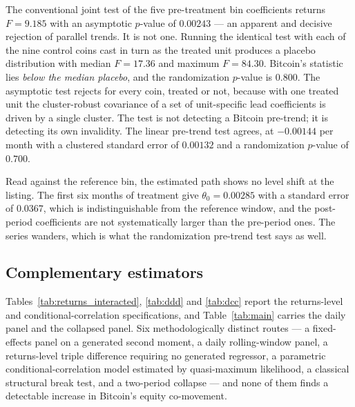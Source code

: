 \documentclass[12pt,a4paper]{article}
\begin{document}
The conventional joint test of the five pre-treatment bin coefficients returns
$F = 9.185$ with an asymptotic $p$-value of
$0.00243$ — an apparent and decisive rejection of parallel trends. It is not one. Running the identical test with each of the nine control coins cast in turn as the treated unit produces a placebo distribution with median
$F = 17.36$ and maximum
$F = 84.30$. Bitcoin's statistic lies \emph{below the median placebo}, and the randomization $p$-value is
$0.800$. The asymptotic test rejects for every coin, treated or not, because with one treated unit the cluster-robust covariance of a set of unit-specific lead coefficients is driven by a single cluster. The test is not detecting a Bitcoin pre-trend; it is detecting its own invalidity. The linear pre-trend test agrees, at
$-0.00144$ per month with a clustered standard error of $0.00132$ and a randomization $p$-value of
$0.700$.

Read against the reference bin, the estimated path shows no level shift at the listing. The first six months of treatment give
$\theta_0 = 0.00285$ with a standard error of $0.0367$, which is indistinguishable from the reference window, and the post-period coefficients are not systematically larger than the pre-period ones. The series wanders, which is what the randomization pre-trend test says as well.

\subsection{Complementary estimators}

Tables~\ref{tab:returns_interacted}, \ref{tab:ddd} and \ref{tab:dcc} report the returns-level and conditional-correlation specifications, and Table~\ref{tab:main} carries the daily panel and the collapsed panel. Six methodologically distinct routes — a fixed-effects panel on a generated second moment, a daily rolling-window panel, a returns-level triple difference requiring no generated regressor, a parametric conditional-correlation model estimated by quasi-maximum likelihood, a classical structural break test, and a two-period collapse — and none of them finds a detectable increase in Bitcoin's equity co-movement.
\end{document}
